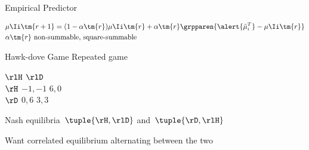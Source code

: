 \begin{frame}
\newcommand{\tabledata}{figures/simulation_theoretical.dat}
\end{frame}
\begin{frame}{Empirical Predictor}

\bigskip
{} \quad \(\begin{aligned}&\mu\Ii\tm{r+1} = (1 - \alpha\tm{r}) \mu\Ii\tm{r} + \alpha\tm{r} \grpparen{\alert{\tilde{\mu}_{i}^{T}} - \mu\Ii\tm{r}}\\&\alpha\tm{r} \text{ non-summable, square-summable}\end{aligned}\)

\end{frame}
\begin{frame}
\newcommand{\tabledata}{figures/simulation_empirical.dat}
\end{frame}
\begin{frame}{Hawk-dove Game}
Repeated game

\bigskip\bigskip


\begin{game}{2}{2}
        \> \(\rlH\)   \> \(\rlD\) \\
\(\rH\) \> \(-1, -1\) \> \(6, 0\) \\
\(\rD\) \> \(0, 6\)   \> \(3, 3\)
\end{game}

\bigskip\bigskip


Nash equilibria~\(\tuple{\rH, \rlD}\) and~\(\tuple{\rD, \rlH}\)

\bigskip

Want correlated equilibrium alternating between the two
\end{frame}
